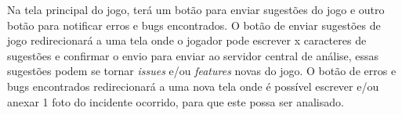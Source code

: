 Na tela principal do jogo, terá um botão para enviar sugestões do jogo e outro botão para notificar erros e bugs encontrados.
O botão de enviar sugestões de jogo redirecionará a uma tela onde o jogador pode escrever x caracteres de sugestões e confirmar o envio para enviar ao servidor central de análise, essas sugestões podem se tornar \textit{issues} e/ou \textit{features} novas do jogo.
O botão de erros e bugs encontrados redirecionará a uma nova tela onde é possível escrever e/ou anexar 1 foto do incidente ocorrido, para que este possa ser analisado.

